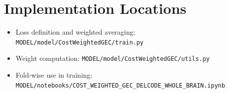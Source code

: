 \documentclass[11pt]{article}
\begin{document}
\section*{Implementation Locations}
\begin{itemize}
\item Loss definition and weighted averaging: \texttt{MODEL/model/CostWeightedGEC/train.py}
\item Weight computation: \texttt{MODEL/model/CostWeightedGEC/utils.py}
\item Fold-wise use in training: \texttt{MODEL/notebooks/COST\_WEIGHTED\_GEC\_DELCODE\_WHOLE\_BRAIN.ipynb}
\end{itemize}
\end{document}

